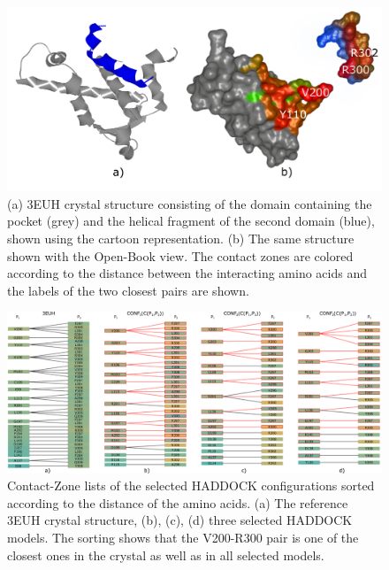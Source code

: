 \documentclass{bmcart}
\def\OpBook {Open-Book view\xspace}
\def\CoZoLists{Contact-Zone lists\xspace}
\begin{document}
\begin{backmatter}
\begin{figure}[h!]
    \centering
    \includegraphics[width=0.9\columnwidth]{images/figure15.pdf}
    \caption{(a) 3EUH crystal structure consisting of the domain containing the pocket (grey) and the helical fragment of the second domain (blue), shown using the cartoon representation. (b) The same structure shown with the \OpBook. The contact zones are colored according to the distance between the interacting amino acids and the labels of the two closest pairs are shown.}
  \label{fig:MukEF_crystal_3EUH_selected}
\end{figure}

\begin{figure}[h!]
    \centering
    \includegraphics[width=0.9\columnwidth]{images/figure16.pdf}
    \caption{ \CoZoLists of the selected HADDOCK configurations sorted according to the distance of the amino acids. (a) The reference 3EUH crystal structure, (b), (c), (d) three selected HADDOCK models. The sorting shows that the V200-R300 pair is one of the closest ones in the crystal as well as in all selected models.}
  \label{fig:list_pocket_string}
\end{figure}


\end{backmatter}
\end{document}
